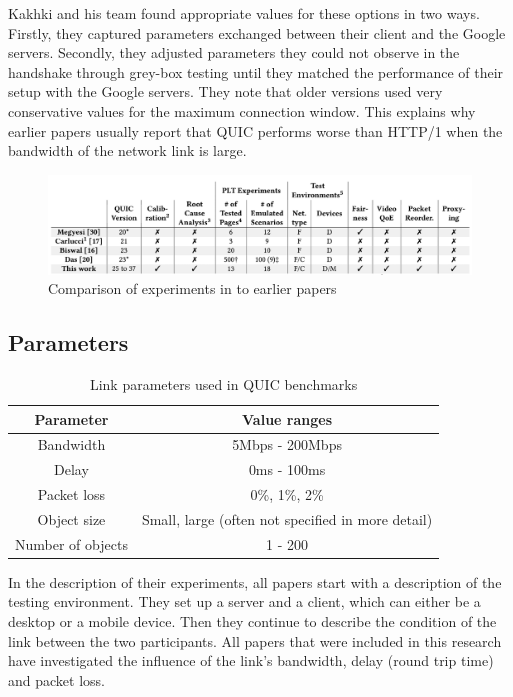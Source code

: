 \documentclass[conference]{IEEEtran}
\begin{document}
Kakhki and his team found appropriate values for these options in two ways. Firstly, they captured parameters exchanged between their client and the Google servers. Secondly, they adjusted parameters they could not observe in the handshake through grey-box testing until they matched the performance of their setup with the Google servers. They note that older versions used very conservative values for the maximum connection window. This explains why earlier papers usually report that QUIC performs worse than HTTP/1 when the bandwidth of the network link is large.

\begin{figure}[t]
\centerline{\includegraphics[width=\textwidth]{images/Kakhki overview.png}}
\caption{Comparison of experiments in \cite{Kakhki} to earlier papers}
\label{fig:Kakhki Comparison}
\end{figure}

\subsection{Parameters}

\begin{table}
\begin{center}
\begin{tabular}{|c|c|}
\hline
\textbf{Parameter} & \textbf{Value ranges} \\
\hline
Bandwidth & 5Mbps - 200Mbps\\
Delay & 0ms - 100ms \\
Packet loss & 0\%, 1\%, 2\% \\
Object size & Small, large (often not specified in more detail) \\
Number of objects & 1 - 200 \\
\hline
\end{tabular}
\end{center}
\caption{Link parameters used in QUIC benchmarks}
\label{fig:quic-parameters}
\end{table}

In the description of their experiments, all papers start with a description of the testing environment. They set up a server and a client, which can either be a desktop or a mobile device. Then they continue to describe the condition of the link between the two participants. All papers that were included in this research have investigated the influence of the link's bandwidth, delay (round trip time) and packet loss. 
\end{document}
